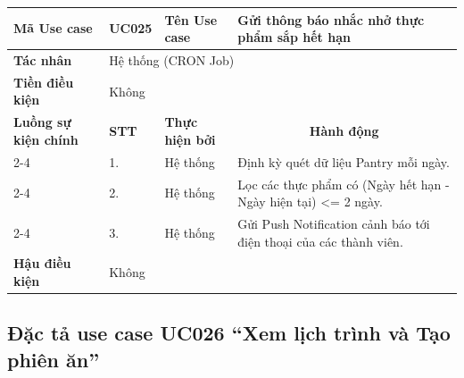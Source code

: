 \documentclass[../main.tex]{subfiles}
\begin{document}
\begin{longtable}{|p{2.7cm}|p{0.8cm}|p{2.6cm}|p{7.3cm}|}
\hline
\cellcolor[HTML]{D5F5E3}\textbf{Mã Use case} & \multicolumn{1}{l|}{UC025} & \cellcolor[HTML]{D5F5E3}\textbf{Tên Use case} & Gửi thông báo nhắc nhở thực phẩm sắp hết hạn \\ \hline
\cellcolor[HTML]{D5F5E3}\textbf{Tác nhân} & \multicolumn{3}{p{10.7cm}|}{Hệ thống (CRON Job)} \\ \hline
\cellcolor[HTML]{D5F5E3}\textbf{Tiền điều kiện} & \multicolumn{3}{p{10.7cm}|}{Không} \\ \hline

\cellcolor[HTML]{D5F5E3}\textbf{Luồng sự kiện chính} & \cellcolor[HTML]{FDEBD0}\textbf{STT} & \cellcolor[HTML]{FDEBD0}\textbf{Thực hiện bởi} & \multicolumn{1}{c|}{\cellcolor[HTML]{FDEBD0}\textbf{Hành động}} \\ \cline{2-4} 
\cellcolor[HTML]{D5F5E3} & 1. & Hệ thống & Định kỳ quét dữ liệu Pantry mỗi ngày. \\ \cline{2-4} 
\cellcolor[HTML]{D5F5E3} & 2. & Hệ thống & Lọc các thực phẩm có (Ngày hết hạn - Ngày hiện tại) <= 2 ngày. \\ \cline{2-4} 
\cellcolor[HTML]{D5F5E3} & 3. & Hệ thống & Gửi Push Notification cảnh báo tới điện thoại của các thành viên. \\ \hline

\cellcolor[HTML]{D5F5E3}\textbf{Hậu điều kiện} & \multicolumn{3}{p{10.7cm}|}{Không} \\ \hline
\end{longtable}
\endgroup

\subsection{Đặc tả use case UC026 ``Xem lịch trình và Tạo phiên ăn''}
\vspace{0.5cm}

\begingroup
\renewcommand{\arraystretch}{1.5}
\end{document}
